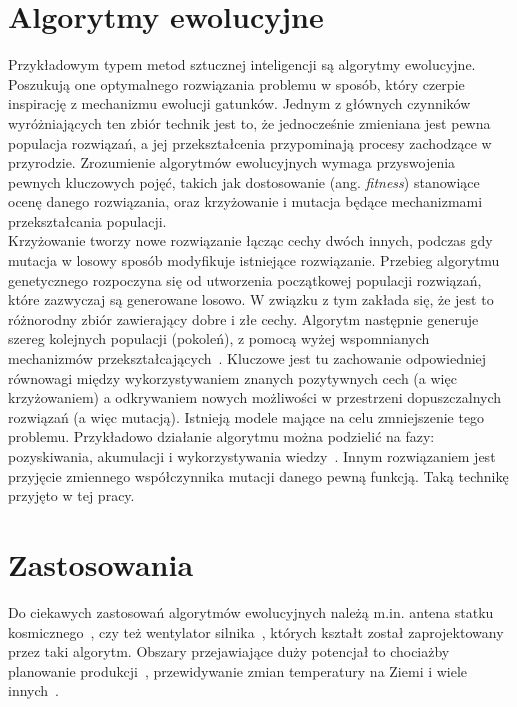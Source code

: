 \section*{Algorytmy ewolucyjne} Przykładowym typem metod sztucznej inteligencji są algorytmy ewolucyjne. Poszukują one optymalnego rozwiązania problemu w sposób, który czerpie inspirację z mechanizmu ewolucji gatunków. Jednym z głównych czynników wyróżniających ten zbiór technik jest to, że jednocześnie zmieniana jest pewna populacja rozwiązań, a jej przekształcenia przypominają procesy zachodzące w przyrodzie. Zrozumienie algorytmów ewolucyjnych wymaga przyswojenia pewnych kluczowych pojęć, takich jak dostosowanie (ang. \textit{fitness}) stanowiące ocenę danego rozwiązania, oraz krzyżowanie i mutacja będące mechanizmami przekształcania populacji. \\Krzyżowanie tworzy nowe rozwiązanie łącząc cechy dwóch innych, podczas gdy mutacja w losowy sposób modyfikuje istniejące rozwiązanie. 
Przebieg algorytmu genetycznego rozpoczyna się od utworzenia początkowej populacji rozwiązań, które zazwyczaj są generowane losowo. W związku z tym zakłada się, że jest to różnorodny zbiór zawierający dobre i złe cechy.
Algorytm następnie generuje szereg kolejnych populacji (pokoleń), z pomocą wyżej wspomnianych mechanizmów przekształcających~\cite{Cohoon:2003:EAP:903758.903786}. Kluczowe jest tu zachowanie odpowiedniej równowagi między wykorzystywaniem znanych pozytywnych cech (a więc krzyżowaniem) a odkrywaniem nowych możliwości w przestrzeni dopuszczalnych rozwiązań (a więc mutacją). Istnieją modele mające na celu zmniejszenie tego problemu. Przykładowo działanie algorytmu można podzielić na fazy: pozyskiwania, akumulacji i wykorzystywania wiedzy~\cite{10.1371/journal.pone.0095693}. Innym rozwiązaniem jest przyjęcie zmiennego współczynnika mutacji danego pewną funkcją. Taką technikę przyjęto w tej pracy. 
\section*{Zastosowania} Do ciekawych zastosowań algorytmów ewolucyjnych należą m.in. antena statku kosmicznego~\cite{Lohn2006AutomatedAD}, czy też wentylator silnika~\cite{article}, których kształt został zaprojektowany przez taki algorytm. Obszary przejawiające duży potencjał to chociażby planowanie produkcji~\cite{Wall:1996:GAR:925320}, przewidywanie zmian temperatury na Ziemi\cite{Stanislawska:2012:MGT:2400749.2401077} i wiele innych~\cite{Steinbuch2010}.